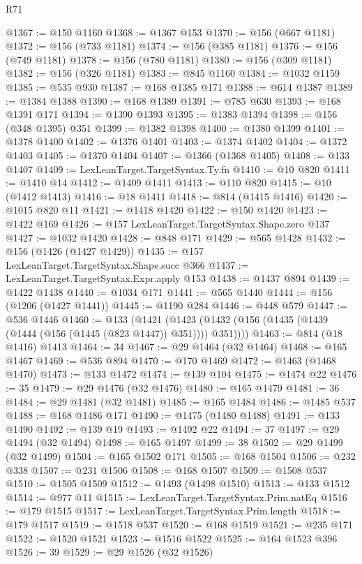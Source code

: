 \begin{lexlean}{R71}
\begin{coremodule}
@1367 := @150 @1160
@1368 := @1367 @153
@1370 := @156 (@667 @1181)
@1372 := @156 (@733 @1181)
@1374 := @156 (@385 @1181)
@1376 := @156 (@749 @1181)
@1378 := @156 (@780 @1181)
@1380 := @156 (@309 @1181)
@1382 := @156 (@326 @1181)
@1383 := @845 @1160
@1384 := @1032 @1159
@1385 := @535 @930
@1387 := @168 @1385 @171
@1388 := @614 @1387
@1389 := @1384 @1388
@1390 := @168 @1389
@1391 := @785 @630
@1393 := @168 @1391 @171
@1394 := @1390 @1393
@1395 := @1383 @1394
@1398 := @156 (@348 @1395) @351
@1399 := @1382 @1398
@1400 := @1380 @1399
@1401 := @1378 @1400
@1402 := @1376 @1401
@1403 := @1374 @1402
@1404 := @1372 @1403
@1405 := @1370 @1404
@1407 := @1366 (@1368 @1405)
@1408 := @133 @1407
@1409 := LexLeanTarget.TargetSyntax.Ty.fn
@1410 := @10 @820
@1411 := @1410 @14
@1412 := @1409 @1411
@1413 := @110 @820
@1415 := @10 (@1412 @1413)
@1416 := @18 @1411
@1418 := @814 (@1415 @1416)
@1420 := @1015 @820 @11
@1421 := @1418 @1420
@1422 := @150 @1420
@1423 := @1422 @169
@1426 := @157 LexLeanTarget.TargetSyntax.Shape.zero @137
@1427 := @1032 @1420
@1428 := @848 @171
@1429 := @565 @1428
@1432 := @156 (@1426 (@1427 @1429))
@1435 := @157 LexLeanTarget.TargetSyntax.Shape.succ @366
@1437 := LexLeanTarget.TargetSyntax.Expr.apply @153
@1438 := @1437 @894
@1439 := @1422 @1438
@1440 := @1034 @171
@1441 := @565 @1440
@1444 := @156 (@1206 (@1427 @1441))
@1445 := @1190 @284
@1446 := @448 @579
@1447 := @536 @1446
@1460 := @133
    (@1421 (@1423 (@1432 (@156 (@1435 (@1439 (@1444 (@156 (@1445 (@823 @1447)) @351)))) @351))))
@1463 := @814 (@18 @1416) @1413
@1464 := 34
@1467 := @29 @1464 (@32 @1464)
@1468 := @165 @1467
@1469 := @536 @894
@1470 := @170 @1469
@1472 := @1463 (@1468 @1470)
@1473 := @133 @1472
@1474 := @139 @104
@1475 := @1474 @22
@1476 := 35
@1479 := @29 @1476 (@32 @1476)
@1480 := @165 @1479
@1481 := 36
@1484 := @29 @1481 (@32 @1481)
@1485 := @165 @1484
@1486 := @1485 @537
@1488 := @168 @1486 @171
@1490 := @1475 (@1480 @1488)
@1491 := @133 @1490
@1492 := @139 @19
@1493 := @1492 @22
@1494 := 37
@1497 := @29 @1494 (@32 @1494)
@1498 := @165 @1497
@1499 := 38
@1502 := @29 @1499 (@32 @1499)
@1504 := @165 @1502 @171
@1505 := @168 @1504
@1506 := @232 @338
@1507 := @231 @1506
@1508 := @168 @1507
@1509 := @1508 @537
@1510 := @1505 @1509
@1512 := @1493 (@1498 @1510)
@1513 := @133 @1512
@1514 := @977 @11
@1515 := LexLeanTarget.TargetSyntax.Prim.natEq
@1516 := @179 @1515
@1517 := LexLeanTarget.TargetSyntax.Prim.length
@1518 := @179 @1517
@1519 := @1518 @537
@1520 := @168 @1519
@1521 := @235 @171
@1522 := @1520 @1521
@1523 := @1516 @1522
@1525 := @164 @1523 @396
@1526 := 39
@1529 := @29 @1526 (@32 @1526)

\end{coremodule}
\end{lexlean}
